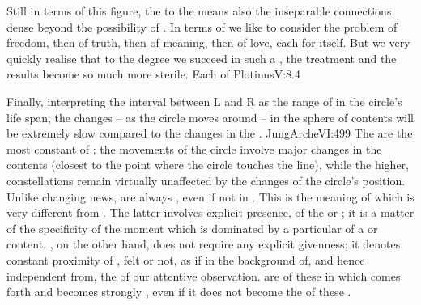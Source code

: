 Still in terms of this figure, the  to the  means also
the inseparable connections, dense beyond the possibility of . In terms of  we like to
consider the problem of freedom, then of truth, then of meaning, then of love,
each for itself. But we very quickly realise that to the degree we succeed in
such a , the treatment and the results become so much more
sterile. Each of  \citet{contains all within itself, and at the
  same time sees all in every other, so that everywhere there is all, and all is
  all and each all [...] In our real all is part rising from part and nothing
  can be more than partial; but There each being is an eternal product of a
  whole and is at once a whole and an individual manifesting as part but, to the
  keen vision There, known for the whole it is.}{Plotinus}{V:8.4}

Finally, interpreting the interval between L and R as the range of
 in the circle's life span, the changes -- as the circle moves
around -- in the sphere of  contents will be extremely slow
compared to the changes in the .  \citet{Whereas we think
  in periods of years, the unconscious thinks and lives in terms of
  millennia.}{JungArche}{VI:499} The  are the most constant
 of : the movements of the circle involve major
changes in the  contents (closest to the point where the circle
touches the line), while the higher,  constellations remain
virtually unaffected by the changes of the circle's position.  Unlike changing
 news,  are always , even if not
 in . This is the meaning of  which
is very different from .  The latter involves explicit
presence,  of the  or ; it is a matter of the
specificity of the moment which is dominated by a particular  of a
 or  content.  , on the other hand, does
not require any explicit givenness; it denotes constant proximity of
, felt or not, as if in the background of, and hence independent
from, the  of our attentive observation.  are
 of these  in which  comes forth
and becomes strongly , even if it does not become the  of these .

